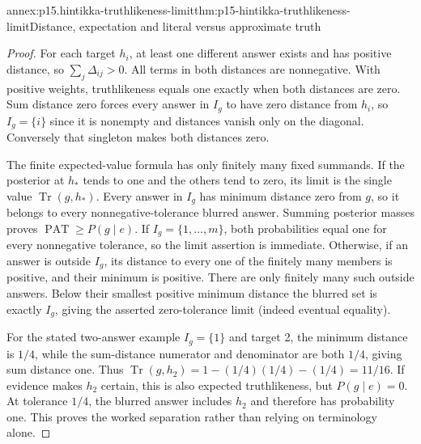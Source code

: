 \begin{annexitem}{annex:p15.hintikka-truthlikeness-limit}{thm:p15-hintikka-truthlikeness-limit}{Distance, expectation and literal versus approximate truth}
\begin{proof}
For each target \(h_i\), at least one different answer exists and
has positive distance, so \(\sum_j\Delta_{ij}>0\). All terms
in both distances are nonnegative. With positive weights, truthlikeness
equals one exactly when both distances are zero. Sum distance zero
forces every answer in \(I_g\) to have zero distance from \(h_i\),
so \(I_g=\{i\}\) since it is nonempty and distances vanish only
on the diagonal. Conversely that singleton makes both distances zero.

The finite expected-value formula has only finitely many fixed summands.
If the posterior at \(h_*\) tends to one and the others tend to
zero, its limit is the single value \(\operatorname{Tr}(g,h_*)\).
Every answer in \(I_g\) has minimum distance zero from \(g\),
so it belongs to every nonnegative-tolerance blurred answer. Summing
posterior masses proves \(\operatorname{PAT}\geq P(g\mid e)\).
If \(I_g=\{1,\ldots,m\}\), both probabilities equal one for every
nonnegative tolerance, so the limit assertion is immediate. Otherwise,
if an answer is outside \(I_g\), its distance to every one of the
finitely many members is positive, and their minimum is positive.
There are only finitely many such outside answers. Below their smallest
positive minimum distance the blurred set is exactly \(I_g\), giving
the asserted zero-tolerance limit (indeed eventual equality).

For the stated two-answer example \(I_g=\{1\}\) and target 2,
the minimum distance is \(1/4\), while the sum-distance numerator
and denominator are both \(1/4\), giving sum distance one.
Thus \(\operatorname{Tr}(g,h_2)=1-(1/4)(1/4)-(1/4)=11/16\).
If evidence makes \(h_2\) certain, this is also expected truthlikeness,
but \(P(g\mid e)=0\). At tolerance \(1/4\), the blurred answer
includes \(h_2\) and therefore has probability one. This proves the
worked separation rather than relying on terminology alone.
\end{proof}
\end{annexitem}
